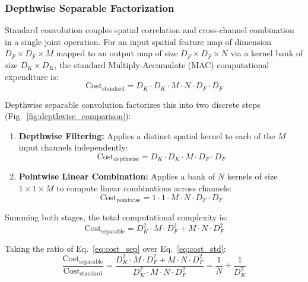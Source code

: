 \documentclass[11pt,a4paper]{article}
\begin{document}
\subsubsection{Depthwise Separable Factorization}
Standard convolution couples spatial correlation and cross-channel combination in a single joint operation. For an input spatial feature map of dimension $D_F \times D_F \times M$ mapped to an output map of size $D_F \times D_F \times N$ via a kernel bank of size $D_K \times D_K$, the standard Multiply-Accumulate (MAC) computational expenditure is:
\begin{equation}
\text{Cost}_{\text{standard}} = D_K \cdot D_K \cdot M \cdot N \cdot D_F \cdot D_F
\label{eq:cost_std}
\end{equation}

Depthwise separable convolution factorizes this into two discrete steps (Fig.~\ref{fig:depthwise_comparison}):
\begin{enumerate}
    \item \textbf{Depthwise Filtering:} Applies a distinct spatial kernel to each of the $M$ input channels independently:
    \begin{equation}
    \text{Cost}_{\text{depthwise}} = D_K \cdot D_K \cdot M \cdot D_F \cdot D_F
    \end{equation}
    \item \textbf{Pointwise Linear Combination:} Applies a bank of $N$ kernels of size $1 \times 1 \times M$ to compute linear combinations across channels:
    \begin{equation}
    \text{Cost}_{\text{pointwise}} = 1 \cdot 1 \cdot M \cdot N \cdot D_F \cdot D_F
    \end{equation}
\end{enumerate}

Summing both stages, the total computational complexity is:
\begin{equation}
\text{Cost}_{\text{separable}} = D_K^2 \cdot M \cdot D_F^2 + M \cdot N \cdot D_F^2
\label{eq:cost_sep}
\end{equation}

Taking the ratio of Eq.~\eqref{eq:cost_sep} over Eq.~\eqref{eq:cost_std}:
\begin{equation}
\frac{\text{Cost}_{\text{separable}}}{\text{Cost}_{\text{standard}}} = \frac{D_K^2 \cdot M \cdot D_F^2 + M \cdot N \cdot D_F^2}{D_K^2 \cdot M \cdot N \cdot D_F^2} = \frac{1}{N} + \frac{1}{D_K^2}
\label{eq:speedup_proof}
\end{equation}
\end{document}
